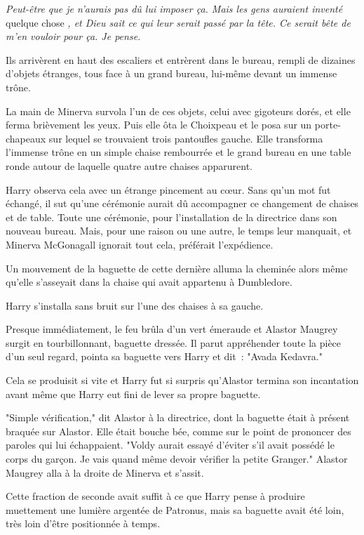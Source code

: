 \emph{Peut-être que je n'aurais pas dû lui imposer ça. Mais les gens auraient inventé} quelque chose \emph{, et Dieu sait ce qui leur serait passé par la tête. Ce serait bête de m'en vouloir pour ça. Je pense.}

Ils arrivèrent en haut des escaliers et entrèrent dans le bureau, rempli de dizaines d'objets étranges, tous face à un grand bureau, lui-même devant un immense trône.

La main de Minerva survola l'un de ces objets, celui avec gigoteurs dorés, et elle ferma brièvement les yeux. Puis elle ôta le Choixpeau et le posa sur un porte-chapeaux sur lequel se trouvaient trois pantoufles gauche. Elle transforma l'immense trône en un simple chaise rembourrée et le grand bureau en une table ronde autour de laquelle quatre autre chaises apparurent.

Harry observa cela avec un étrange pincement au cœur. Sans qu'un mot fut échangé, il sut qu'une cérémonie aurait dû accompagner ce changement de chaises et de table. Toute une cérémonie, pour l'installation de la directrice dans son nouveau bureau. Mais, pour une raison ou une autre, le temps leur manquait, et Minerva McGonagall ignorait tout cela, préférait l'expédience.

Un mouvement de la baguette de cette dernière alluma la cheminée alors même qu'elle s'asseyait dans la chaise qui avait appartenu à Dumbledore.

Harry s'installa sans bruit sur l'une des chaises à sa gauche.

Presque immédiatement, le feu brûla d'un vert émeraude et Alastor Maugrey surgit en tourbillonnant, baguette dressée. Il parut appréhender toute la pièce d'un seul regard, pointa sa baguette vers Harry et dit~: "Avada Kedavra."

Cela se produisit si vite et Harry fut si surpris qu'Alastor termina son incantation avant même que Harry eut fini de lever sa propre baguette.

"Simple vérification," dit Alastor à la directrice, dont la baguette était à présent braquée sur Alastor. Elle était bouche bée, comme sur le point de prononcer des paroles qui lui échappaient. "Voldy aurait essayé d'éviter s'il avait possédé le corps du garçon. Je vais quand même devoir vérifier la petite Granger." Alastor Maugrey alla à la droite de Minerva et s'assit.

Cette fraction de seconde avait suffit à ce que Harry pense à produire muettement une lumière argentée de Patronus, mais sa baguette avait été loin, très loin d'être positionnée à temps.


